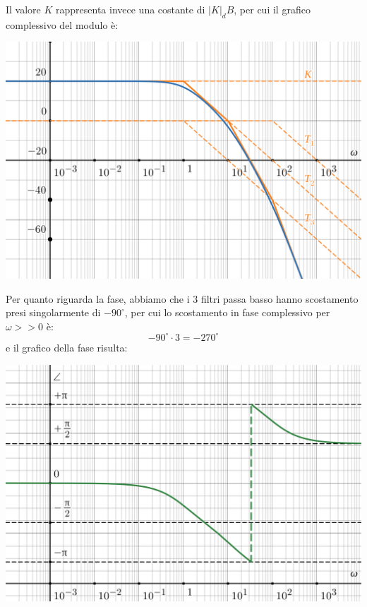 \documentclass[a4paper,11pt]{article}
\begin{document}
\noindent
\begin{minipage}{\textwidth}

Il valore $K$ rappresenta invece una costante di $|K|_dB$, per cui il grafico complessivo del modulo è:
\begin{center}
	\includegraphics[scale=0.3]{../figures/nyquist/second_ex_1.png}
\end{center}

\end{minipage}

Per quanto riguarda la fase, abbiamo che i 3 filtri passa basso hanno scostamento presi singolarmente di $-90^\circ$, per cui lo scostamento in fase complessivo per $\omega >> 0$ è:
$$
-90^\circ \cdot 3 = -270^\circ
$$
e il grafico della fase risulta:
\begin{center}
	\includegraphics[scale=0.3]{../figures/nyquist/second_ex_2.png}
\end{center}
\end{document}

